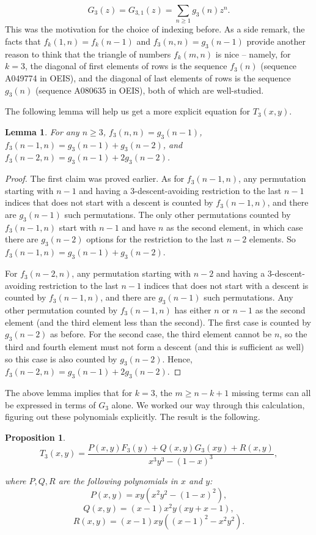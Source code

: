 \documentclass{amsart}
\newtheorem{lemma}[theorem]{Lemma}
\newtheorem{proposition}[theorem]{Proposition}
\theoremstyle{definition}
\begin{document}
\[G_3(z)=G_{3,1}(z)=\sum_{n\geq 1}g_3(n)z^n.\]
This was the motivation for the choice of indexing before. As a side remark, the facts that $f_k(1,n)=f_k(n-1)$ and $f_3(n,n)=g_3(n-1)$ provide another reason to think that the triangle of numbers $f_k(m,n)$ is nice -- namely, for $k=3$, the diagonal of first elements of rows is the sequence $f_3(n)$ (sequence A049774 in OEIS), and the diagonal of last elements of rows is the sequence $g_3(n)$ (sequence A080635 in OEIS), both of which are well-studied.

The following lemma will help us get a more explicit equation for $T_3(x,y)$.

\begin{lemma}
For any $n\geq 3$, $f_3(n,n)=g_3(n-1)$, $f_3(n-1,n)=g_3(n-1)+g_3(n-2)$, and $f_3(n-2,n)=g_3(n-1)+2g_3(n-2)$.
\end{lemma}

\begin{proof}
The first claim was proved earlier. As for $f_3(n-1,n)$, any permutation starting with $n-1$ and having a $3$-descent-avoiding restriction to the last $n-1$ indices that does not start with a descent is counted by $f_3(n-1,n)$, and there are $g_3(n-1)$ such permutations. The only other permutations counted by $f_3(n-1,n)$ start with $n-1$ and have $n$ as the second element, in which case there are $g_3(n-2)$ options for the restriction to the last $n-2$ elements. So $f_3(n-1,n)=g_3(n-1)+g_3(n-2)$.

For $f_3(n-2,n)$, any permutation starting with $n-2$ and having a $3$-descent-avoiding restriction to the last $n-1$ indices that does not start with a descent is counted by $f_3(n-1,n)$, and there are $g_3(n-1)$ such permutations. Any other permutation counted by $f_3(n-1,n)$ has either $n$ or $n-1$ as the second element (and the third element less than the second). The first case is counted by $g_3(n-2)$ as before. For the second case, the third element cannot be $n$, so the third and fourth element must not form a descent (and this is sufficient as well) so this case is also counted by $g_3(n-2)$. Hence, $f_3(n-2,n)=g_3(n-1)+2g_3(n-2)$.
\end{proof}

The above lemma implies that for $k=3$, the $m\geq n-k+1$ missing terms can all be expressed in terms of $G_3$ alone. We worked our way through this calculation, figuring out these polynomials explicitly. The result is the following.

\begin{proposition}\label{prop:gen}
\[T_3(x,y)=\frac{P(x,y)F_3(y)+Q(x,y)G_3(xy)+R(x,y)}{x^3 y^3-(1-x)^3},\]

where $P,Q,R$ are the following polynomials in $x$ and $y$:
\[P(x,y)=xy(x^2y^2-(1-x)^2),\]
\[Q(x,y)=(x-1)x^2y(xy+x-1),\]
\[R(x,y)=(x-1)xy\left((x-1)^2-x^2y^2\right).\]
\end{proposition}
\end{document}
